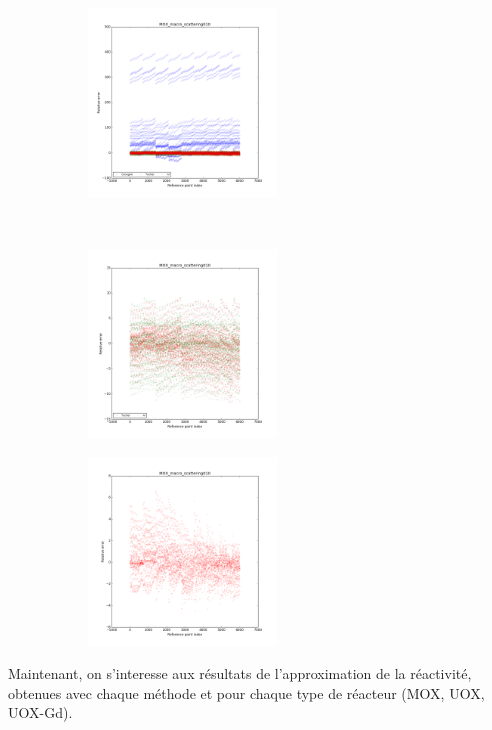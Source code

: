 \begin{center}
\begin{figure}[!h]\ContinuedFloat
		\centering
		\begin{subfigure}[b]{0.45\textwidth}
				\includegraphics[width=\linewidth,height=5cm]{images/MOX/MOX_macro_scattering010_with_cocagne.png}
		\end{subfigure}
		~
		\begin{subfigure}[b]{0.45\textwidth}
				\includegraphics[width=\linewidth,height=5cm]{images/MOX/MOX_macro_scattering010.png}
		\end{subfigure}
		\begin{subfigure}[b]{0.45\textwidth}
				\includegraphics[width=\linewidth,height=5cm]{images/MOX/MOX_macro_scattering010_alone.png}
		\end{subfigure}
\end{figure}
\end{center}
\hspace{0.5cm} Maintenant, on s'interesse aux résultats de l'approximation de la réactivité, obtenues avec chaque méthode et pour chaque type de réacteur (MOX, UOX, UOX-Gd).
